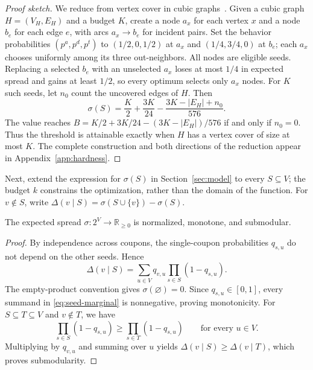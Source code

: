 \documentclass[sigconf]{acmart}
\begin{document}
\begin{proof}[Proof sketch]
We reduce from vertex cover in cubic graphs~\cite{garey1976simplified}.
Given a cubic graph $H=(V_H,E_H)$ and a budget $K$, create a node $a_x$
for each vertex $x$ and a node $b_e$ for each edge $e$, with arcs
$a_x\to b_e$ for incident pairs. Set the behavior probabilities
$(p^a,p^d,p^t)$ to $(1/2,0,1/2)$ at $a_x$ and $(1/4,3/4,0)$ at $b_e$;
each $a_x$ chooses uniformly among its three out-neighbors.
All nodes are eligible seeds. Replacing a selected $b_e$ with an
unselected $a_x$ loses at most $1/4$ in expected spread and gains at
least $1/2$, so every optimum selects only $a_x$ nodes.
For $K$ such seeds, let $n_0$ count the uncovered edges of $H$. Then
\[
  \sigma(S)=\frac{K}{2}+\frac{3K}{24}
             -\frac{3K-|E_H|+n_0}{576}.
\]
The value reaches $B=K/2+3K/24-(3K-|E_H|)/576$ if and only if
$n_0=0$. Thus the threshold is attainable exactly when $H$ has a
vertex cover of size at most $K$. The complete construction and both
directions of the reduction appear in Appendix~\ref{app:hardness}.
\end{proof}

Next, extend the expression for $\sigma(S)$ in
Section~\ref{sec:model} to every $S\subseteq V$; the budget $k$
constrains the optimization, rather than the domain of the function.
For $v\notin S$, write
$\Delta(v\mid S)=\sigma(S\cup\{v\})-\sigma(S)$.

\begin{theorem}
\label{thm:monosub}
The expected spread $\sigma:2^V\to\mathbb{R}_{\geq 0}$ is normalized,
monotone, and submodular.
\end{theorem}

\begin{proof}
By independence across coupons, the single-coupon probabilities
$q_{s,u}$ do not depend on the other seeds. Hence
\begin{equation}
\label{eq:seed-marginal}
  \Delta(v\mid S)
    =\sum_{u\in V}q_{v,u}\prod_{s\in S}(1-q_{s,u}).
\end{equation}
The empty-product convention gives $\sigma(\varnothing)=0$.
Since $q_{s,u}\in[0,1]$, every summand in
\eqref{eq:seed-marginal} is nonnegative, proving monotonicity.
For $S\subseteq T\subseteq V$ and $v\notin T$, we have
\[
  \prod_{s\in S}(1-q_{s,u})
    \geq\prod_{s\in T}(1-q_{s,u})
  \qquad\text{for every }u\in V.
\]
Multiplying by $q_{v,u}$ and summing over $u$ yields
$\Delta(v\mid S)\geq\Delta(v\mid T)$, which proves submodularity.
\end{proof}
\end{document}
